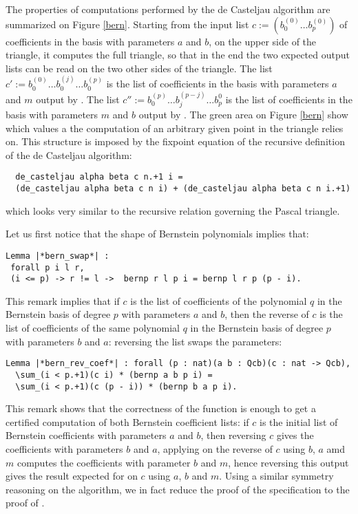 \documentclass{mscs}
\begin{document}
The properties of computations performed by the de Casteljau algorithm
are summarized on Figure \ref{bern}. Starting from the input list
$c := (b_0^(0)\dots b_p^{(0)})$ of coefficients in the basis with
parameters $a$ and $b$, on the upper side of the triangle, it
computes the full triangle, so that in the end the two expected output
lists can be read on the two  other sides of the triangle. The list
$c' := b_0^{(0)} \dots b_0^{(j)} \dots b_0^{(p)}$ is the list of
coefficients in the basis with parameters $a$ and $m$ output by
. The list
$c'' := b_0^{(p)} \dots b_j^{(p - j)} \dots b_p^{0}$
 is the list of coefficients in the basis with parameters $m$ and $b$
 output by .  The green area on Figure \ref{bern} show which values
a the computation of an arbitrary given point in the triangle relies on.
This structure is imposed by the fixpoint
 equation of the recursive definition of the de Casteljau algorithm:
\begin{lstlisting}
  de_casteljau alpha beta c n.+1 i =
  (de_casteljau alpha beta c n i) + (de_casteljau alpha beta c n i.+1)
\end{lstlisting}
which looks very similar to the recursive relation governing the
Pascal triangle.

Let us first notice that the shape of Bernstein polynomials implies
that:
\begin{lstlisting}
Lemma |*bern_swap*| :
 forall p i l r,
 (i <= p) -> r != l ->  bernp r l p i = bernp l r p (p - i).
\end{lstlisting}
This remark implies that if $c$ is the list of coefficients of the
polynomial $q$ in the Bernstein basis of degree $p$ with parameters
$a$ and $b$, then the reverse of $c$ is the list of coefficients of
the same polynomial $q$ in the Bernstein basis of degree $p$ with
parameters $b$ and $a$: reversing the list swaps the parameters:

\begin{lstlisting}
Lemma |*bern_rev_coef*| : forall (p : nat)(a b : Qcb)(c : nat -> Qcb),
  \sum_(i < p.+1)(c i) * (bernp a b p i) =
  \sum_(i < p.+1)(c (p - i)) * (bernp b a p i).
\end{lstlisting}
This remark shows that the correctness of the  function is
enough to get a certified computation of both Bernstein coefficient
lists: if $c$ is the
initial list of Bernstein coefficients with parameters $a$ and $b$, then
reversing $c$ gives the  coefficients with parameters $b$ and $a$,
applying  on the reverse of $c$ using $b$, $a$ amd $m$
computes the coefficients with parameter $b$ and $m$, hence reversing
this output gives the result expected for  on $c$ using $a$,
$b$ and $m$. Using a similar symmetry reasoning on the
 algorithm, we in fact reduce the proof of the
 specification to the proof of .
\end{document}
